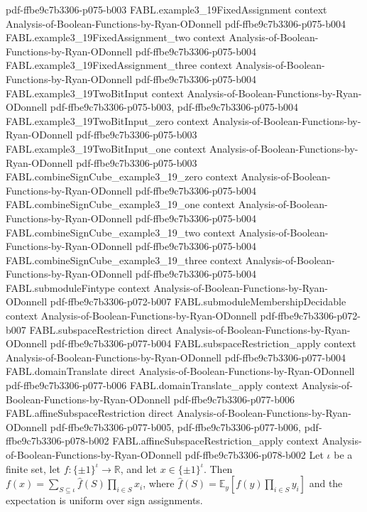 \begin{theorem}
  {pdf-ffbe9c7b3306-p075-b003}
\proofstep
  {FABL.example3_19FixedAssignment}
  {context}
  {Analysis-of-Boolean-Functions-by-Ryan-ODonnell}
  {pdf-ffbe9c7b3306-p075-b004}
\proofstep
  {FABL.example3_19FixedAssignment_two}
  {context}
  {Analysis-of-Boolean-Functions-by-Ryan-ODonnell}
  {pdf-ffbe9c7b3306-p075-b004}
\proofstep
  {FABL.example3_19FixedAssignment_three}
  {context}
  {Analysis-of-Boolean-Functions-by-Ryan-ODonnell}
  {pdf-ffbe9c7b3306-p075-b004}
\proofstep
  {FABL.example3_19TwoBitInput}
  {context}
  {Analysis-of-Boolean-Functions-by-Ryan-ODonnell}
  {pdf-ffbe9c7b3306-p075-b003,
    pdf-ffbe9c7b3306-p075-b004}
\proofstep
  {FABL.example3_19TwoBitInput_zero}
  {context}
  {Analysis-of-Boolean-Functions-by-Ryan-ODonnell}
  {pdf-ffbe9c7b3306-p075-b003}
\proofstep
  {FABL.example3_19TwoBitInput_one}
  {context}
  {Analysis-of-Boolean-Functions-by-Ryan-ODonnell}
  {pdf-ffbe9c7b3306-p075-b003}
\proofstep
  {FABL.combineSignCube_example3_19_zero}
  {context}
  {Analysis-of-Boolean-Functions-by-Ryan-ODonnell}
  {pdf-ffbe9c7b3306-p075-b004}
\proofstep
  {FABL.combineSignCube_example3_19_one}
  {context}
  {Analysis-of-Boolean-Functions-by-Ryan-ODonnell}
  {pdf-ffbe9c7b3306-p075-b004}
\proofstep
  {FABL.combineSignCube_example3_19_two}
  {context}
  {Analysis-of-Boolean-Functions-by-Ryan-ODonnell}
  {pdf-ffbe9c7b3306-p075-b004}
\proofstep
  {FABL.combineSignCube_example3_19_three}
  {context}
  {Analysis-of-Boolean-Functions-by-Ryan-ODonnell}
  {pdf-ffbe9c7b3306-p075-b004}
\proofstep
  {FABL.submoduleFintype}
  {context}
  {Analysis-of-Boolean-Functions-by-Ryan-ODonnell}
  {pdf-ffbe9c7b3306-p072-b007}
\proofstep
  {FABL.submoduleMembershipDecidable}
  {context}
  {Analysis-of-Boolean-Functions-by-Ryan-ODonnell}
  {pdf-ffbe9c7b3306-p072-b007}
\proofstep
  {FABL.subspaceRestriction}
  {direct}
  {Analysis-of-Boolean-Functions-by-Ryan-ODonnell}
  {pdf-ffbe9c7b3306-p077-b004}
\proofstep
  {FABL.subspaceRestriction_apply}
  {context}
  {Analysis-of-Boolean-Functions-by-Ryan-ODonnell}
  {pdf-ffbe9c7b3306-p077-b004}
\proofstep
  {FABL.domainTranslate}
  {direct}
  {Analysis-of-Boolean-Functions-by-Ryan-ODonnell}
  {pdf-ffbe9c7b3306-p077-b006}
\proofstep
  {FABL.domainTranslate_apply}
  {context}
  {Analysis-of-Boolean-Functions-by-Ryan-ODonnell}
  {pdf-ffbe9c7b3306-p077-b006}
\proofstep
  {FABL.affineSubspaceRestriction}
  {direct}
  {Analysis-of-Boolean-Functions-by-Ryan-ODonnell}
  {pdf-ffbe9c7b3306-p077-b005,
    pdf-ffbe9c7b3306-p077-b006,
    pdf-ffbe9c7b3306-p078-b002}
\proofstep
  {FABL.affineSubspaceRestriction_apply}
  {context}
  {Analysis-of-Boolean-Functions-by-Ryan-ODonnell}
  {pdf-ffbe9c7b3306-p078-b002}
Let $\iota$ be a finite set, let $f:\{\pm1\}^{\iota}\to\mathbb R$, and let
$x\in\{\pm1\}^{\iota}$. Then $f(x)=\sum_{S\subseteq\iota}\widehat f(S)\prod_{i\in
S}x_i$, where $\widehat f(S)=\mathbb E_y[f(y)\prod_{i\in S}y_i]$ and the expectation is
uniform over sign assignments.
\end{theorem}

